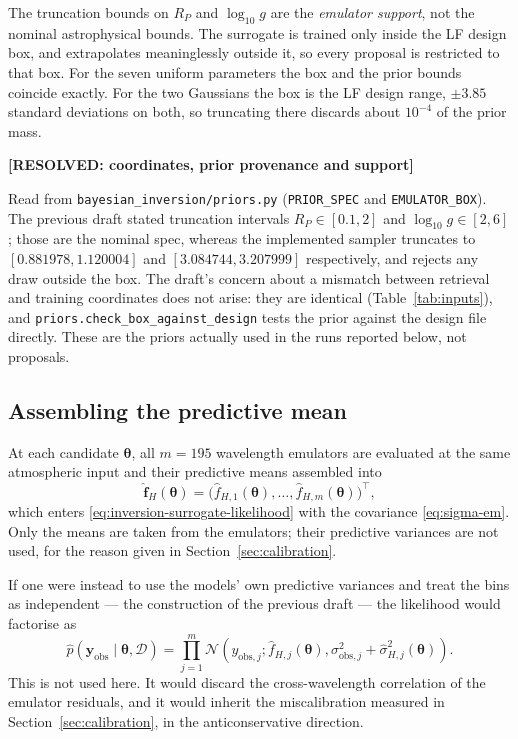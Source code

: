 \documentclass[12pt, letterpaper, oneside]{article}
\newcommand{\resolved}[2]{\par\begingroup\small\color{green!35!black}%
\noindent\textbf{[RESOLVED: #1]}\par\nobreak\noindent #2\par\endgroup}
\begin{document}
The truncation bounds on $R_P$ and $\log_{10}g$ are the \emph{emulator
support}, not the nominal astrophysical bounds. The surrogate is trained only
inside the LF design box, and extrapolates meaninglessly outside it, so every
proposal is restricted to that box. For the seven uniform parameters the box
and the prior bounds coincide exactly. For the two Gaussians the box is the
LF design range, $\pm3.85$ standard deviations on both, so truncating there
discards about $10^{-4}$ of the prior mass.

\resolved{coordinates, prior provenance and support}{Read from
\texttt{bayesian\_inversion/priors.py} (\texttt{PRIOR\_SPEC} and
\texttt{EMULATOR\_BOX}). The previous draft stated truncation intervals
$R_P\in[0.1,2]$ and $\log_{10}g\in[2,6]$; those are the nominal spec, whereas
the implemented sampler truncates to $[0.881978, 1.120004]$ and
$[3.084744, 3.207999]$ respectively, and rejects any draw outside the box. The
draft's concern about a mismatch between retrieval and training coordinates
does not arise: they are identical (Table~\ref{tab:inputs}), and
\texttt{priors.check\_box\_against\_design} tests the prior against the design
file directly. These are the priors actually used in the runs reported below,
not proposals.}

\subsection{Assembling the predictive mean}
\label{subsubsec:model1-posterior}

At each candidate $\bm\theta$, all $m=195$ wavelength emulators are evaluated
at the same atmospheric input and their predictive means assembled into
\begin{equation}
    \widehat{\mathbf f}_H(\bm\theta)
    =
    \bigl(
        \widehat f_{H,1}(\bm\theta),\ldots,
        \widehat f_{H,m}(\bm\theta)
    \bigr)^\top,
\end{equation}
which enters \eqref{eq:inversion-surrogate-likelihood} with the covariance
\eqref{eq:sigma-em}. Only the means are taken from the emulators; their
predictive variances are not used, for the reason given in
Section~\ref{sec:calibration}.

If one were instead to use the models' own predictive variances and treat the
bins as independent --- the construction of the previous draft --- the
likelihood would factorise as
\begin{equation}
    \widehat p(\mathbf y_{\mathrm{obs}}
        \mid\bm\theta,\mathcal D)
    =
    \prod_{j=1}^{m}
    \mathcal N\!\left(
        y_{\mathrm{obs},j};
        \widehat f_{H,j}(\bm\theta),
        \sigma_{\mathrm{obs},j}^{2}
        +\widehat\sigma^{2}_{H,j}(\bm\theta)
    \right).
    \label{eq:model1-wavelength-likelihood}
\end{equation}
This is not used here. It would discard the cross-wavelength correlation of
the emulator residuals, and it would inherit the miscalibration measured in
Section~\ref{sec:calibration}, in the anticonservative direction.
\end{document}
